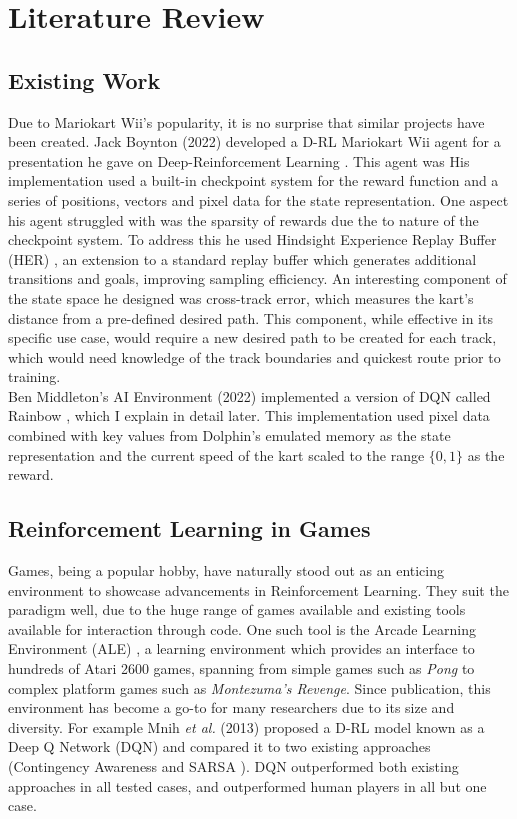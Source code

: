 \chapter{Literature Review}
\section{Existing Work}
Due to Mariokart Wii's popularity, it is no surprise that similar projects have been created. Jack Boynton (2022) developed a D-RL Mariokart Wii agent for a presentation he gave on Deep-Reinforcement Learning \cite{JackWBoynton}. This agent was  His implementation used a built-in checkpoint system for the reward function and a series of positions, vectors and pixel data for the state representation. One aspect his agent struggled with was the sparsity of rewards due the to nature of the checkpoint system. To address this he used Hindsight Experience Replay Buffer (HER) \cite{andrychowicz2017hindsight}, an extension to a standard replay buffer which generates additional transitions and goals, improving sampling efficiency. An interesting component of the state space he designed was cross-track error, which measures the kart's distance from a pre-defined desired path. This component, while effective in its specific use case, would require a new desired path to be created for each track, which would need knowledge of the track boundaries and quickest route prior to training. \\Ben Middleton's AI Environment (2022)\cite{BenJMiddleton} implemented a version of DQN called Rainbow \cite{hessel2018rainbow}, which I explain in detail later. This implementation used pixel data combined with key values from Dolphin's emulated memory as the state representation and the current speed of the kart scaled to the range $\{0,1\}$ as the reward.
\section{Reinforcement Learning in Games}
Games, being a popular hobby, have naturally stood out as an enticing environment to showcase advancements in Reinforcement Learning. They suit the paradigm well, due to the huge range of games available and existing tools available for interaction through code. One such tool is the Arcade Learning Environment (ALE) \cite{bellemare2013arcade}, a learning environment which provides an interface to hundreds of Atari 2600 games, spanning from simple games such as \textit{Pong} to complex platform games such as \textit{Montezuma's Revenge}. Since publication, this environment has become a go-to for many researchers due to its size and diversity. For example Mnih \textit{et al.} (2013) \cite{mnih2013playing} proposed a D-RL model known as a Deep Q Network (DQN) and compared it to two existing approaches (Contingency Awareness \cite{bellemare2012investigating} and SARSA \cite{rummery1994line}). DQN outperformed both existing approaches in all tested cases, and outperformed human players in all but one case. 
